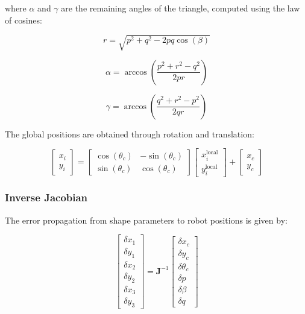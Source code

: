 \documentclass[lettersize,journal]{IEEEtran}
\begin{document}
where $\alpha$ and $\gamma$ are the remaining angles of the triangle, computed using the law of cosines:

\begin{equation}
r = \sqrt{p^2 + q^2 - 2pq\cos(\beta)}
\end{equation}

\begin{equation}
\alpha = \arccos\left(\frac{p^2 + r^2 - q^2}{2pr}\right)
\end{equation}

\begin{equation}
\gamma = \arccos\left(\frac{q^2 + r^2 - p^2}{2qr}\right)
\end{equation}

The global positions are obtained through rotation and translation:

\begin{equation}
\begin{bmatrix} x_i \\ y_i \end{bmatrix} = 
\begin{bmatrix} \cos(\theta_c) & -\sin(\theta_c) \\ \sin(\theta_c) & \cos(\theta_c) \end{bmatrix}
\begin{bmatrix} x_i^{\text{local}} \\ y_i^{\text{local}} \end{bmatrix} +
\begin{bmatrix} x_c \\ y_c \end{bmatrix}
\end{equation}

\subsubsection{Inverse Jacobian}

The error propagation from shape parameters to robot positions is given by:

\begin{equation}
\begin{bmatrix} 
\delta x_1 \\ \delta y_1 \\ \delta x_2 \\ \delta y_2 \\ \delta x_3 \\ \delta y_3 
\end{bmatrix} = 
\mathbf{J}^{-1}
\begin{bmatrix}
\delta x_c \\ \delta y_c \\ \delta \theta_c \\ \delta p \\ \delta \beta \\ \delta q
\end{bmatrix}
\end{equation}
\end{document}
